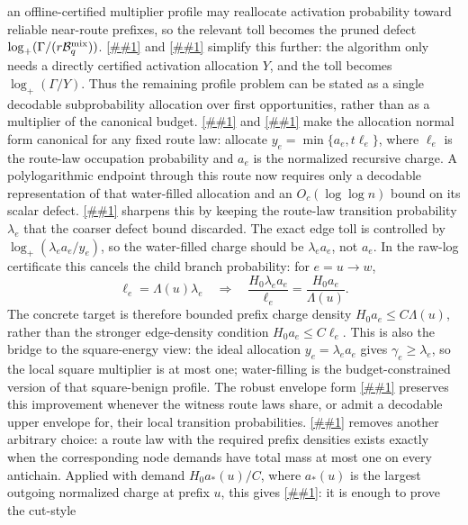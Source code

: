 \documentclass[10pt]{article}
\newcommand{\cref}[1]{\ref{##1}}
\newcommand{\Cref}[1]{\ref{##1}}
\theoremstyle{definition}
\begin{document}
an offline-certified multiplier profile may reallocate activation probability
toward reliable near-route prefixes, so the relevant toll becomes the pruned
defect \(\log_+(\Gamma/(r\mathcal B_q^{\rm mix}))\).
\Cref{lem:budget-allocation-thinning} and
\cref{cor:allocation-defect-toll} simplify this further: the algorithm only
needs a directly certified activation allocation \(Y\), and the toll becomes
\(\log_+(\Gamma/Y)\).  Thus the remaining profile problem can be stated as a
single decodable subprobability allocation over first opportunities, rather
than as a multiplier of the canonical budget.
\Cref{lem:waterfilled-allocation} and
\cref{cor:waterfilled-allocation-defect} make the allocation normal form
canonical for any fixed route law: allocate \(y_e=\min\{a_e,t\ell_e\}\), where
\(\ell_e\) is the route-law occupation probability and \(a_e\) is the
normalized recursive charge.  A polylogarithmic endpoint through this route now
requires only a decodable representation of that water-filled allocation and an
\(O_c(\log\log n)\) bound on its scalar defect.
\Cref{cor:transition-waterfilled-allocation} sharpens this by keeping the
route-law transition probability \(\lambda_e\) that the coarser defect bound
discarded.  The exact edge toll is controlled by
\(\log_+(\lambda_ea_e/y_e)\), so the water-filled charge should be
\(\lambda_ea_e\), not \(a_e\).  In the raw-log certificate this cancels the
child branch probability:
for \(e=u\to w\),
\[
   \ell_e=\Lambda(u)\lambda_e
   \quad\Longrightarrow\quad
   \frac{H_0\lambda_ea_e}{\ell_e}=\frac{H_0a_e}{\Lambda(u)} .
\]
The concrete target is therefore bounded prefix charge density
\(H_0a_e\le C\Lambda(u)\), rather than the stronger edge-density condition
\(H_0a_e\le C\ell_e\).  This is also the bridge to the square-energy view:
the ideal allocation \(y_e=\lambda_ea_e\) gives \(\gamma_e\ge\lambda_e\), so
the local square multiplier is at most one; water-filling is the
budget-constrained version of that square-benign profile.  The robust envelope
form \cref{cor:robust-transition-envelope-raw-log} preserves this improvement
whenever the witness route laws share, or admit a decodable upper envelope for,
their local transition probabilities.
\Cref{lem:antichain-prefix-density-flow} removes another arbitrary choice: a
route law with the required prefix densities exists exactly when the
corresponding node demands have total mass at most one on every antichain.
Applied with demand \(H_0a_*(u)/C\), where \(a_*(u)\) is the largest outgoing
normalized charge at prefix \(u\), this gives
\cref{cor:antichain-transition-waterfill}: it is enough to prove the cut-style
\end{document}
